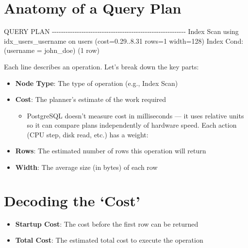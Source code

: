 \documentclass[
]{report}
\newenvironment{Shaded}{\begin{snugshade}}{\end{snugshade}}
\newcommand{\NormalTok}[1]{\textcolor[rgb]{0.00,0.23,0.31}{#1}}
\providecommand{\tightlist}{%
  \setlength{\itemsep}{0pt}\setlength{\parskip}{0pt}}\usepackage{longtable,booktabs,array}
\begin{document}
\section{Anatomy of a Query Plan}\label{anatomy-of-a-query-plan}

\begin{Shaded}
\begin{Highlighting}[]
\NormalTok{                        QUERY PLAN}
\NormalTok{{-}{-}{-}{-}{-}{-}{-}{-}{-}{-}{-}{-}{-}{-}{-}{-}{-}{-}{-}{-}{-}{-}{-}{-}{-}{-}{-}{-}{-}{-}{-}{-}{-}{-}{-}{-}{-}{-}{-}{-}{-}{-}{-}{-}{-}{-}{-}{-}{-}{-}{-}{-}{-}{-}{-}{-}{-}{-}{-}}
\NormalTok{ Index Scan using idx\_users\_username on users  (cost=0.29..8.31}
\NormalTok{  rows=1 width=128)}
\NormalTok{    Index Cond: (username = \textquotesingle{}john\_doe\textquotesingle{})}
\NormalTok{(1 row)}
\end{Highlighting}
\end{Shaded}

Each line describes an operation. Let's break down the key parts:

\begin{itemize}
\tightlist
\item
  \textbf{Node Type}: The type of operation (e.g., Index Scan)
\item
  \textbf{Cost}: The planner's estimate of the work required

  \begin{itemize}
  \tightlist
  \item
    PostgreSQL doesn't measure cost in milliseconds --- it uses relative
    units so it can compare plans independently of hardware speed. Each
    action (CPU step, disk read, etc.) has a weight:
  \end{itemize}
\item
  \textbf{Rows}: The estimated number of rows this operation will return
\item
  \textbf{Width}: The average size (in bytes) of each row
\end{itemize}

\section{Decoding the `Cost'}\label{decoding-the-cost}

\begin{itemize}
\tightlist
\item
  \textbf{Startup Cost}: The cost before the first row can be returned
\item
  \textbf{Total Cost}: The estimated total cost to execute the operation
\end{itemize}
\end{document}
